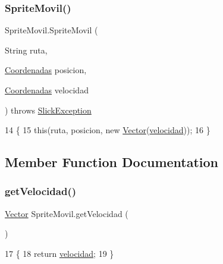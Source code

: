 \subsubsection{\texorpdfstring{Sprite\+Movil()}{SpriteMovil()}\hspace{0.1cm}{\footnotesize\ttfamily [2/2]}}
{\footnotesize\ttfamily Sprite\+Movil.\+Sprite\+Movil (\begin{DoxyParamCaption}\item[{String}]{ruta,  }\item[{\mbox{\hyperlink{class_coordenadas}{Coordenadas}}}]{posicion,  }\item[{\mbox{\hyperlink{class_coordenadas}{Coordenadas}}}]{velocidad }\end{DoxyParamCaption}) throws \mbox{\hyperlink{classorg_1_1newdawn_1_1slick_1_1_slick_exception}{Slick\+Exception}}\hspace{0.3cm}{\ttfamily [inline]}}


\begin{DoxyCode}
14                                                                                                       \{
15         \textcolor{keyword}{this}(ruta, posicion, \textcolor{keyword}{new} \mbox{\hyperlink{class_vector}{Vector}}(\mbox{\hyperlink{class_sprite_movil_a5f99cf7fe355c17b0dc3edb2f6fb4969}{velocidad}}));
16     \}
\end{DoxyCode}


\subsection{Member Function Documentation}
\mbox{\label{class_sprite_movil_ac4622b6fb7f8fce4f6cf66db376cd38d}} 
\subsubsection{\texorpdfstring{get\+Velocidad()}{getVelocidad()}}
{\footnotesize\ttfamily \mbox{\hyperlink{class_vector}{Vector}} Sprite\+Movil.\+get\+Velocidad (\begin{DoxyParamCaption}{ }\end{DoxyParamCaption})\hspace{0.3cm}{\ttfamily [inline]}}


\begin{DoxyCode}
17                                  \{
18         \textcolor{keywordflow}{return} \mbox{\hyperlink{class_sprite_movil_a5f99cf7fe355c17b0dc3edb2f6fb4969}{velocidad}};
19     \}
\end{DoxyCode}
\mbox{\label{class_sprite_movil_ad1477094c3bcef96fa83b7582f03ecb9}} 

